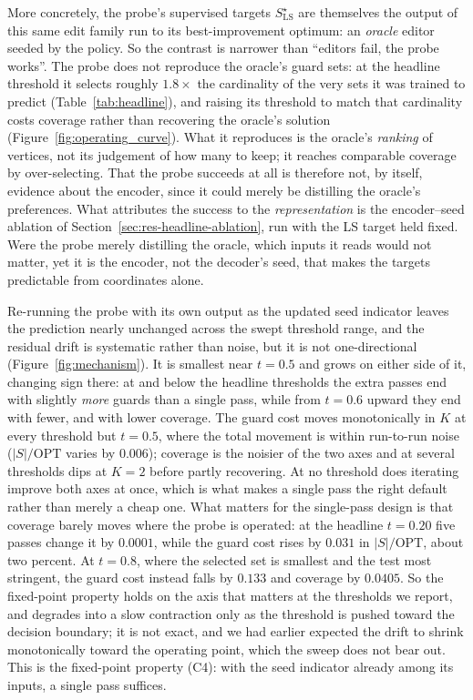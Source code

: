 \documentclass[11pt]{article}
\newcommand{\OPT}{\mathrm{OPT}}
\begin{document}
More concretely, the probe's supervised targets $S^\star_{\mathrm{LS}}$ are themselves the output of this same edit family run to its best-improvement optimum: an \emph{oracle} editor seeded by the policy. So the contrast is narrower than ``editors fail, the probe works''. The probe does not reproduce the oracle's guard sets: at the headline threshold it selects roughly $1.8\times$ the cardinality of the very sets it was trained to predict (Table~\ref{tab:headline}), and raising its threshold to match that cardinality costs coverage rather than recovering the oracle's solution (Figure~\ref{fig:operating_curve}). What it reproduces is the oracle's \emph{ranking} of vertices, not its judgement of how many to keep; it reaches comparable coverage by over-selecting. That the probe succeeds at all is therefore not, by itself, evidence about the encoder, since it could merely be distilling the oracle's preferences. What attributes the success to the \emph{representation} is the encoder--seed ablation of Section~\ref{sec:res-headline-ablation}, run with the LS target held fixed. Were the probe merely distilling the oracle, which inputs it reads would not matter, yet it is the encoder, not the decoder's seed, that makes the targets predictable from coordinates alone.

Re-running the probe with its own output as the updated seed indicator leaves the prediction nearly unchanged across the swept threshold range, and the residual drift is systematic rather than noise, but it is not one-directional (Figure~\ref{fig:mechanism}). It is smallest near $t = 0.5$ and grows on either side of it, changing sign there: at and below the headline thresholds the extra passes end with slightly \emph{more} guards than a single pass, while from $t = 0.6$ upward they end with fewer, and with lower coverage. The guard cost moves monotonically in $K$ at every threshold but $t = 0.5$, where the total movement is within run-to-run noise ($|S|/\OPT$ varies by $0.006$); coverage is the noisier of the two axes and at several thresholds dips at $K = 2$ before partly recovering. At no threshold does iterating improve both axes at once, which is what makes a single pass the right default rather than merely a cheap one. What matters for the single-pass design is that coverage barely moves where the probe is operated: at the headline $t = 0.20$ five passes change it by $0.0001$, while the guard cost rises by $0.031$ in $|S|/\OPT$, about two percent. At $t = 0.8$, where the selected set is smallest and the test most stringent, the guard cost instead falls by $0.133$ and coverage by $0.0405$. So the fixed-point property holds on the axis that matters at the thresholds we report, and degrades into a slow contraction only as the threshold is pushed toward the decision boundary; it is not exact, and we had earlier expected the drift to shrink monotonically toward the operating point, which the sweep does not bear out. This is the fixed-point property (C4): with the seed indicator already among its inputs, a single pass suffices.
\end{document}
